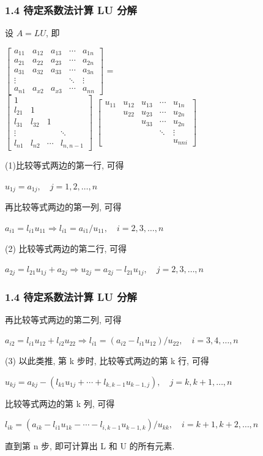 \documentclass[notheorems,serif]{beamer}
\begin{document}
\begin{frame}
\frametitle{1.4 \quad 待定系数法计算 LU 分解}
设 $A = LU$, 即

{$\left[\begin{array}{ccccc}{a_{11}} & {a_{12}} & {a_{13}} & {\cdots} & {a_{1 n}} \\ {a_{21}} & {a_{22}} & {a_{23}} & {\cdots} & {a_{2 n}} \\ {a_{31}} & {a_{32}} & {a_{33}} & {\cdots} & {a_{3 n}} \\ {\vdots} & {} & {} & {\ddots} & {\vdots} \\ {a_{n 1}} & {a_{x 2}} & {a_{x 3}} & {\cdots} & {a_{n n}}\end{array}\right]$ =\\
	\qquad \qquad $\left[\begin{array}{cccc}{1} & {} & {} & {} \\ {l_{21}} & {1} & {} & {} \\ {l_{31}} & {l_{32}} & {1} & {} \\ {\vdots} & {} & {} & {\ddots} \\ {l_{n 1}} & {l_{n 2}} & {\cdots} & {l_{n, n-1}}\end{array}\right]$ $\left[\begin{array}{ccccc}{u_{11}} & {u_{12}} & {u_{13}} & {\cdots} & {u_{1 n}} \\ {} & {u_{22}} & {u_{23}} & {\cdots} & {u_{2 n}} \\ {} & {} & {u_{33}} & {\cdots} & {u_{2 n}} \\ {} & {} & {} & {\ddots} & {\vdots} \\ {} & {} & {} & {} & {u_{n n i}}\end{array}\right] $}

\noindent(1)比较等式两边的第一行, 可得

$u_{1 j}=a_{1 j}, \quad j=1,2, \dots, n$

再比较等式两边的第一列, 可得

$a_{i 1}=l_{i 1} u_{11} \Rightarrow l_{i 1}=a_{i 1} / u_{11}, \quad i=2,3, \ldots, n$

\noindent(2) 比较等式两边的第二行, 可得

$a_{2 j}=l_{21} u_{1 j}+a_{2 j} \Rightarrow u_{2 j}=a_{2 j}-l_{21} u_{1 j}, \quad j=2,3, \ldots, n$
\end{frame}

\begin{frame}
\frametitle{1.4 \quad 待定系数法计算 LU 分解}
再比较等式两边的第二列, 可得

$a_{i 2}=l_{i 1} u_{12}+l_{i 2} u_{22} \Rightarrow l_{i 1}=\left(a_{i 2}-l_{i 1} u_{12}\right) / u_{22}, \quad i=3,4, \ldots, n$

\noindent(3) 以此类推, 第 k 步时, 比较等式两边的第 k 行, 可得

$u_{k j}=a_{k j}-\left(l_{k 1} u_{1 j}+\cdots+l_{k, k-1} u_{k-1, j}\right), \quad j=k, k+1, \ldots, n$

比较等式两边的第 k 列, 可得

$l_{i k}=\left(a_{i k}-l_{i 1} u_{1 k}-\cdots-l_{i, k-1} u_{k-1, k}\right) / u_{k k}, \quad i=k+1, k+2, \ldots, n$

直到第 n 步, 即可计算出 L 和 U 的所有元素.
\end{frame}
\end{document}
